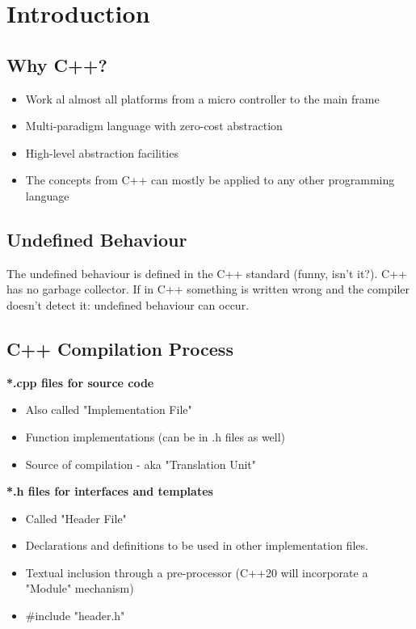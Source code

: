 \section{Introduction}
\subsection{Why C++?}
\begin{itemize}
  \itemsep0em 
  \item Work al almost all platforms from a micro controller to the main frame
  \item Multi-paradigm language with zero-cost abstraction
  \item High-level abstraction facilities
  \item The concepts from C++ can mostly be applied to any other programming language
\end{itemize}

\subsection{Undefined Behaviour}
The undefined behaviour is defined in the C++ standard (funny, isn't it?). C++ has no garbage collector. If in C++ something is written wrong and the compiler doesn't detect it: undefined behaviour can occur.

\subsection{C++ Compilation Process}
\textbf{*.cpp files for source code}
\begin{itemize}
  \itemsep -0.5em 
  \item Also called "Implementation File"
  \item Function implementations (can be in .h files as well)
  \item Source of compilation - aka "Translation Unit"
\end{itemize}
\textbf{*.h files for interfaces and templates}
\begin{itemize}
  \itemsep -0.5em 
  \item Called "Header File"
  \item Declarations and definitions to be used in other implementation files.
  \item Textual inclusion through a pre-processor (C++20 will incorporate a "Module" mechanism)
  \item \#include "header.h"
\end{itemize}

